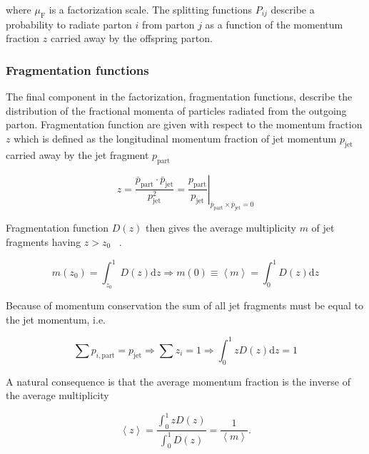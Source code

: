\noindent where $\mu_{\mathrm{F}}$ is a factorization scale. The splitting functions $P_{ij}$ describe a probability to radiate parton $i$ from parton $j$ as a function of the momentum fraction $z$ carried away by the offspring parton. 

\subsubsection*{Fragmentation functions}
The final component in the factorization, fragmentation functions, describe the distribution of the fractional momenta of particles radiated from the outgoing parton. Fragmentation function are given with respect to the momentum fraction $z$ which is defined as the longitudinal momentum fraction of jet momentum $p_{\mathrm{jet}}$ carried away by the jet fragment $p_{\mathrm{part}}$


\begin{equation}
z = \frac{\bar p_{\mathrm{part}} \cdot \bar p_{\mathrm{jet}}}{p^2_{\mathrm{jet}}} = \left.\frac{p_{\mathrm{part}}}{p_{\mathrm{jet}}}\right\vert_{\bar{p}_\mathrm{part} \times \bar{p}_\mathrm{jet}=0}
\end{equation}

Fragmentation function $D\left(z\right)$ then gives the average multiplicity $m$ of jet fragments having $z > z_0$ ~\cite{}. 

\begin{equation}
m\left(z_0\right) = \int_{z_0}^1 D\left(z\right) \mathrm{d} z \Rightarrow m\left(0\right) \equiv \left< m \right> = \int_0^1 D\left(z\right) \mathrm{d}z
\end{equation}

Because of momentum conservation the sum of all jet fragments must be equal to the jet momentum, i.e. 

\begin{equation}
\sum p_{i,\mathrm{part}} = p_\mathrm{jet} \Rightarrow \sum z_i = 1 \Rightarrow \int_0^1 z D\left(z\right) \mathrm{d} z = 1
\end{equation}

A natural consequence is that the average momentum fraction is the inverse of the average multiplicity

\begin{equation}
\left<z \right> = \frac{\int_0^1 z D\left(z\right) }{\int_0^1 D\left(z\right) } = \frac{1}{\left< m \right>}.
\end{equation}


